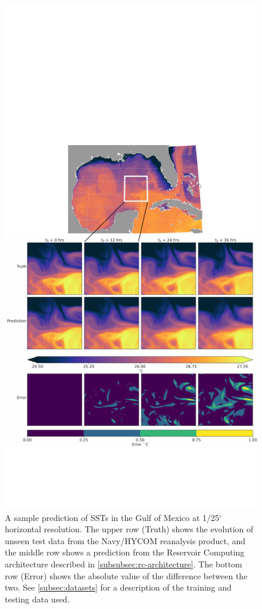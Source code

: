 \begin{figure}
    \centering
    \includegraphics[width=.8\textwidth]{../figures/rc_gom_sst.pdf}
    \caption{A sample prediction of SSTs in the Gulf of Mexico at 1/25$^\circ$
        horizontal resolution.
        The upper row (Truth) shows the evolution of unseen test data from the
        Navy/HYCOM reanalysis product, and the middle row shows a prediction
        from the Reservoir Computing architecture described in
        \cref{subsubsec:rc-architecture}.
        The bottom row (Error) shows the absolute value of the difference between the two.
        See \cref{subsec:datasets} for a description of the training and testing data
        used.
    }
    \label{fig:gom_sst}
\end{figure}


